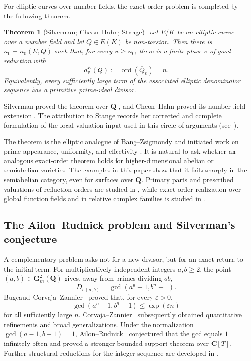 \documentclass[11pt,letterpaper,reqno]{amsart}
\newtheorem{theorem}{Theorem}[section]
\theoremstyle{definition}
\theoremstyle{remark}
\newcommand{\Gm}{\mathbf G_m}
\newcommand{\Q}{\mathbf Q}
\newcommand{\ord}{\operatorname{ord}}
\begin{document}
For elliptic curves over number fields, the exact-order problem is completed
by the following theorem.

\begin{theorem}[Silverman; Cheon--Hahn; Stange]
\label{thm:intro-silverman-cheon-hahn}
Let $E/K$ be an elliptic curve over a number field and let $Q\in E(K)$ be
non-torsion.  Then there is $n_0=n_0(E,Q)$ such that, for every $n\ge n_0$,
there is a finite place $v$ of good reduction with
\[
        d_v^E(Q):=\ord(\overline Q_v)=n.
\]
Equivalently, every sufficiently large term of the associated elliptic
denominator sequence has a primitive prime-ideal divisor.
\end{theorem}

Silverman proved the theorem over $\Q$ \cite[Proposition~10]{Silverman1988}, and Cheon--Hahn proved its
number-field extension
\cite[Main Theorem]{CheonHahn1999}.
The attribution to Stange records her corrected and complete formulation of the
local valuation input used in this circle of arguments (see~\cite[Theorem~6.1, Corollary~6.4, and Remark~6.5]{Stange2016Valuations}).



The theorem is the elliptic analogue of Bang--Zsigmondy and initiated work on
prime appearance, uniformity, and effectivity
\cite{EinsiedlerEverestWard2001,EverestShparlinski2005,
EverestMcLarenWard2006,Verzobio2023}.  It is natural to ask whether an
analogous exact-order theorem holds for higher-dimensional abelian or
semiabelian varieties.  The examples in this paper show that it fails
sharply in the semiabelian category, even for surfaces over $\Q$.  Primary
parts and prescribed valuations of reduction orders are studied in
\cite{Pink2004,Perucca2009}, while exact-order realization over global
function fields and in relative complex families is studied in
\cite{NguyenDangNguyen2026}.

\subsection{The Ailon--Rudnick problem and Silverman's conjecture}


A complementary problem asks not for a new divisor, but for an exact return to
the initial term.  For multiplicatively independent integers $a,b\ge2$, the
point $(a,b)\in\Gm^2(\Q)$ gives, away from primes dividing $ab$,
\[
 D_{n(a,b)}=\gcd(a^n-1,b^n-1).
\]
Bugeaud--Corvaja--Zannier~\cite{BugeaudCorvajaZannier2003} proved that, for every $\varepsilon>0$,
\[
 \gcd(a^n-1,b^n-1)\le \exp(\varepsilon n)
\]
for all sufficiently large $n$.  Corvaja--Zannier~\cite{CorvajaZannier2005} subsequently obtained quantitative refinements and broad
generalizations. Under the normalization
$\gcd(a-1,b-1)=1$, Ailon--Rudnick~\cite{AilonRudnick2004} conjectured that the gcd equals $1$
infinitely often and proved a stronger bounded-support theorem over
$\mathbf C[T]$.  Further structural reductions for
the integer sequence are developed in \cite{NguyenDangGCD2026}.
\end{document}
